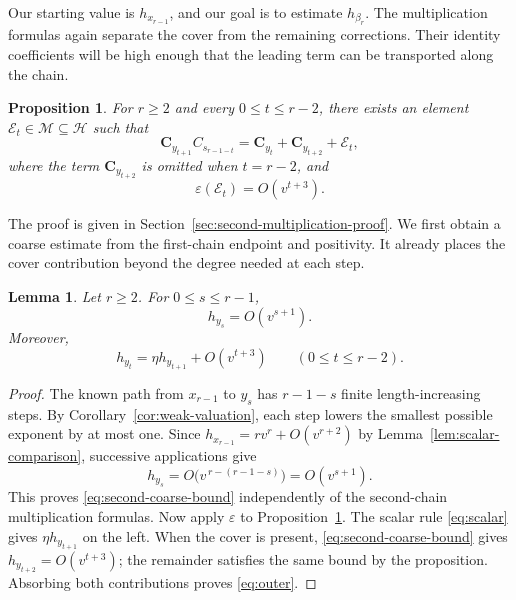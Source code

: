 \documentclass[11pt,a4paper,reqno]{amsart}
\numberwithin{equation}{section}
\newtheorem{proposition}[theorem]{Proposition}
\newtheorem{lemma}[theorem]{Lemma}
\theoremstyle{definition}
\theoremstyle{remark}
\theoremstyle{plain}
\newcommand{\C}{\mathbf C}
\newcommand{\M}{\mathcal M}
\newcommand{\eps}{\varepsilon}
\begin{document}
{\color{black}
Our starting value is $h_{x_{r-1}}$, and our goal is to estimate
$h_{\beta_r}$. The multiplication formulas again separate the cover
from the remaining corrections. Their identity coefficients will be high
enough that the leading term can be transported along the chain.

\begin{proposition}
\label{prop:second-multiplication}
For $r\geq2$ and every $0\leq t\leq r-2$, there exists an element
$\mathcal E_t\in\M\subseteq\mathcal H$ such that
\begin{equation}\label{eq:second-multiplication}
 \C_{y_{t+1}}C_{s_{r-1-t}}
 =\C_{y_t}+\C_{y_{t+2}}+\mathcal E_t,
\end{equation}
where the term $\C_{y_{t+2}}$ is omitted when $t=r-2$, and
\[
 \eps(\mathcal E_t)=O(v^{t+3}).
\]
\end{proposition}
The proof is given in Section~\ref{sec:second-multiplication-proof}.
We first obtain a coarse estimate from the first-chain endpoint and
positivity. It already places the cover contribution beyond the degree
needed at each step.

\begin{lemma}\label{lem:second-recurrence}
Let $r\geq2$. For $0\leq s\leq r-1$,
\begin{equation}\label{eq:second-coarse-bound}
 h_{y_s}=O(v^{s+1}).
\end{equation}
Moreover,
\begin{equation}\label{eq:outer}
 h_{y_t}=\eta h_{y_{t+1}}+O(v^{t+3})\qquad(0\leq t\leq r-2).
\end{equation}
\end{lemma}
\begin{proof}
The known path from $x_{r-1}$ to $y_s$ has $r-1-s$ finite
length-increasing steps. By Corollary~\ref{cor:weak-valuation}, each step lowers the smallest
possible exponent by at most one. Since
$h_{x_{r-1}}=rv^r+O(v^{r+2})$ by Lemma~\ref{lem:scalar-comparison},
successive applications give
\[
 h_{y_s}=O\bigl(v^{\,r-(r-1-s)}\bigr)=O(v^{s+1}).
\]
This proves \eqref{eq:second-coarse-bound} independently of the
second-chain multiplication formulas.
Now apply $\eps$ to Proposition~\ref{prop:second-multiplication}.
The scalar rule \eqref{eq:scalar} gives $\eta h_{y_{t+1}}$ on the left.
When the cover is present, \eqref{eq:second-coarse-bound} gives
$h_{y_{t+2}}=O(v^{t+3})$; the remainder satisfies the same bound by the
proposition. Absorbing both contributions proves \eqref{eq:outer}.
\end{proof}

}
\end{document}
